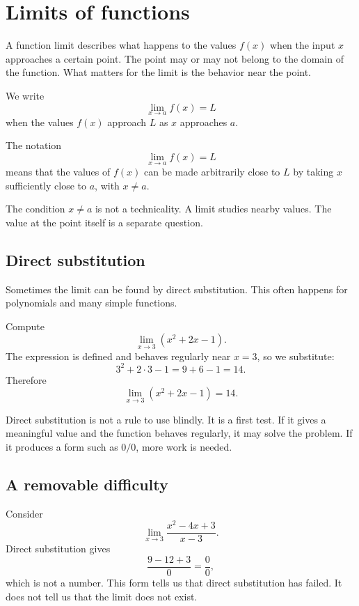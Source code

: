 \section{Limits of functions}

A function limit describes what happens to the values \(f(x)\) when the input \(x\) approaches a certain point. The point may or may not belong to the domain of the function. What matters for the limit is the behavior near the point.

We write
\[
\lim_{x\to a} f(x)=L
\]
when the values \(f(x)\) approach \(L\) as \(x\) approaches \(a\).

\begin{definitionbox}
The notation
\[
\lim_{x\to a} f(x)=L
\]
means that the values of \(f(x)\) can be made arbitrarily close to \(L\) by taking \(x\) sufficiently close to \(a\), with \(x\ne a\).
\end{definitionbox}

The condition \(x\ne a\) is not a technicality. A limit studies nearby values. The value at the point itself is a separate question.

\subsection*{Direct substitution}

Sometimes the limit can be found by direct substitution. This often happens for polynomials and many simple functions.

\begin{examplebox}
Compute
\[
\lim_{x\to3}(x^2+2x-1).
\]
The expression is defined and behaves regularly near \(x=3\), so we substitute:
\[
3^2+2\cdot3-1=9+6-1=14.
\]
Therefore
\[
\lim_{x\to3}(x^2+2x-1)=14.
\]
\end{examplebox}

Direct substitution is not a rule to use blindly. It is a first test. If it gives a meaningful value and the function behaves regularly, it may solve the problem. If it produces a form such as \(0/0\), more work is needed.

\subsection*{A removable difficulty}

Consider
\[
\lim_{x\to3}\frac{x^2-4x+3}{x-3}.
\]
Direct substitution gives
\[
\frac{9-12+3}{0}=\frac0{0},
\]
which is not a number. This form tells us that direct substitution has failed. It does not tell us that the limit does not exist.

